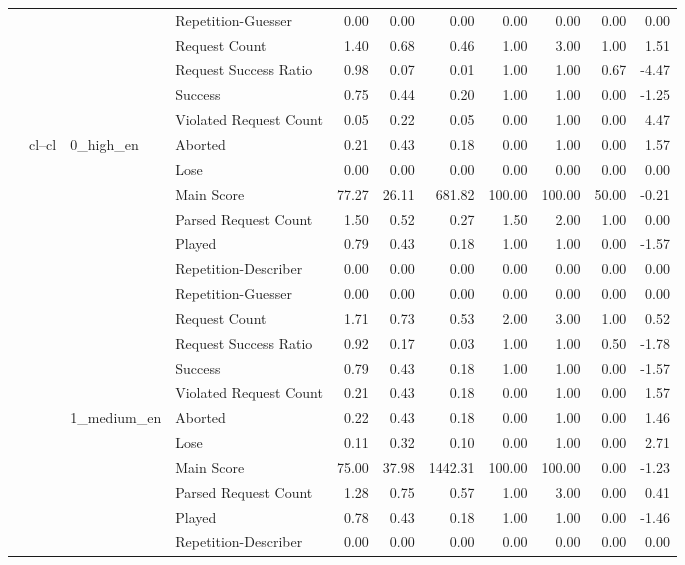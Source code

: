 \begin{tabular}{llllrrrrrrr}
 &  &  & Repetition-Guesser & 0.00 & 0.00 & 0.00 & 0.00 & 0.00 & 0.00 & 0.00 \\
 &  &  & Request Count & 1.40 & 0.68 & 0.46 & 1.00 & 3.00 & 1.00 & 1.51 \\
 &  &  & Request Success Ratio & 0.98 & 0.07 & 0.01 & 1.00 & 1.00 & 0.67 & -4.47 \\
 &  &  & Success & 0.75 & 0.44 & 0.20 & 1.00 & 1.00 & 0.00 & -1.25 \\
 &  &  & Violated Request Count & 0.05 & 0.22 & 0.05 & 0.00 & 1.00 & 0.00 & 4.47 \\
\cline{2-11} \cline{3-11}
 & \multirow[t]{33}{*}{cl--cl} & \multirow[t]{11}{*}{0_high_en} & Aborted & 0.21 & 0.43 & 0.18 & 0.00 & 1.00 & 0.00 & 1.57 \\
 &  &  & Lose & 0.00 & 0.00 & 0.00 & 0.00 & 0.00 & 0.00 & 0.00 \\
 &  &  & Main Score & 77.27 & 26.11 & 681.82 & 100.00 & 100.00 & 50.00 & -0.21 \\
 &  &  & Parsed Request Count & 1.50 & 0.52 & 0.27 & 1.50 & 2.00 & 1.00 & 0.00 \\
 &  &  & Played & 0.79 & 0.43 & 0.18 & 1.00 & 1.00 & 0.00 & -1.57 \\
 &  &  & Repetition-Describer & 0.00 & 0.00 & 0.00 & 0.00 & 0.00 & 0.00 & 0.00 \\
 &  &  & Repetition-Guesser & 0.00 & 0.00 & 0.00 & 0.00 & 0.00 & 0.00 & 0.00 \\
 &  &  & Request Count & 1.71 & 0.73 & 0.53 & 2.00 & 3.00 & 1.00 & 0.52 \\
 &  &  & Request Success Ratio & 0.92 & 0.17 & 0.03 & 1.00 & 1.00 & 0.50 & -1.78 \\
 &  &  & Success & 0.79 & 0.43 & 0.18 & 1.00 & 1.00 & 0.00 & -1.57 \\
 &  &  & Violated Request Count & 0.21 & 0.43 & 0.18 & 0.00 & 1.00 & 0.00 & 1.57 \\
\cline{3-11}
 &  & \multirow[t]{11}{*}{1_medium_en} & Aborted & 0.22 & 0.43 & 0.18 & 0.00 & 1.00 & 0.00 & 1.46 \\
 &  &  & Lose & 0.11 & 0.32 & 0.10 & 0.00 & 1.00 & 0.00 & 2.71 \\
 &  &  & Main Score & 75.00 & 37.98 & 1442.31 & 100.00 & 100.00 & 0.00 & -1.23 \\
 &  &  & Parsed Request Count & 1.28 & 0.75 & 0.57 & 1.00 & 3.00 & 0.00 & 0.41 \\
 &  &  & Played & 0.78 & 0.43 & 0.18 & 1.00 & 1.00 & 0.00 & -1.46 \\
 &  &  & Repetition-Describer & 0.00 & 0.00 & 0.00 & 0.00 & 0.00 & 0.00 & 0.00 \\

\end{tabular}
